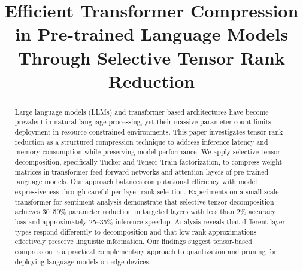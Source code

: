 \documentclass[conference]{IEEEtran}
\begin{document}

\title{Efficient Transformer Compression in Pre-trained Language Models Through Selective Tensor Rank Reduction\\
}

\author{
}

\maketitle


\begin{abstract}
Large language models (LLMs) and transformer based architectures have become prevalent in natural language processing, 
yet their massive parameter count limits deployment in resource constrained environments. This paper investigates 
tensor rank reduction as a structured compression technique to address inference latency and memory consumption 
while preserving model performance. We apply selective tensor decomposition, specifically Tucker and Tensor-Train 
factorization, to compress weight matrices in transformer feed forward networks and attention layers of pre-trained 
language models. Our approach balances computational efficiency with model expressiveness through careful per-layer 
rank selection. Experiments on a small scale transformer for sentiment analysis demonstrate that selective tensor 
decomposition achieves 30–50\% parameter reduction in targeted layers with less than 2\% accuracy loss and 
approximately 25–35\% inference speedup. Analysis reveals that different layer types respond differently to 
decomposition and that low-rank approximations effectively preserve linguistic information. Our findings suggest 
tensor-based compression is a practical complementary approach to quantization and pruning for deploying 
language models on edge devices.
\end{abstract}
\end{document}
